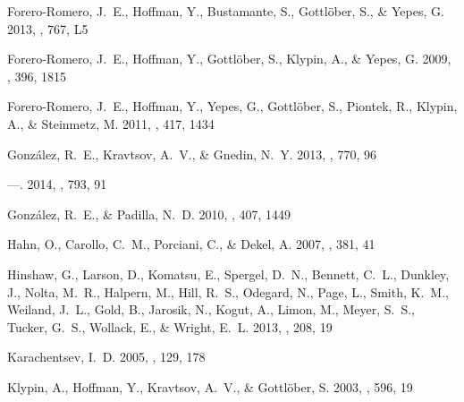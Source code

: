 \documentclass{emulateapj}
\begin{document}
\begin{thebibliography}{48}
{Forero-Romero}, J.~E., {Hoffman}, Y., {Bustamante}, S., {Gottl{\"o}ber}, S.,
  \& {Yepes}, G. 2013, \apjl, 767, L5

{Forero-Romero}, J.~E., {Hoffman}, Y., {Gottl{\"o}ber}, S., {Klypin}, A., \&
  {Yepes}, G. 2009, \mnras, 396, 1815

{Forero-Romero}, J.~E., {Hoffman}, Y., {Yepes}, G., {Gottl{\"o}ber}, S.,
  {Piontek}, R., {Klypin}, A., \& {Steinmetz}, M. 2011, \mnras, 417, 1434

{Gonz{\'a}lez}, R.~E., {Kravtsov}, A.~V., \& {Gnedin}, N.~Y. 2013, \apj, 770,
  96

---. 2014, \apj, 793, 91

{Gonz{\'a}lez}, R.~E., \& {Padilla}, N.~D. 2010, \mnras, 407, 1449

{Hahn}, O., {Carollo}, C.~M., {Porciani}, C., \& {Dekel}, A. 2007, \mnras, 381,
  41

{Hinshaw}, G., {Larson}, D., {Komatsu}, E., {Spergel}, D.~N., {Bennett}, C.~L.,
  {Dunkley}, J., {Nolta}, M.~R., {Halpern}, M., {Hill}, R.~S., {Odegard}, N.,
  {Page}, L., {Smith}, K.~M., {Weiland}, J.~L., {Gold}, B., {Jarosik}, N.,
  {Kogut}, A., {Limon}, M., {Meyer}, S.~S., {Tucker}, G.~S., {Wollack}, E., \&
  {Wright}, E.~L. 2013, \apjs, 208, 19

{Karachentsev}, I.~D. 2005, \aj, 129, 178

{Klypin}, A., {Hoffman}, Y., {Kravtsov}, A.~V., \& {Gottl{\"o}ber}, S. 2003,
  \apj, 596, 19


\end{thebibliography}
\end{document}
